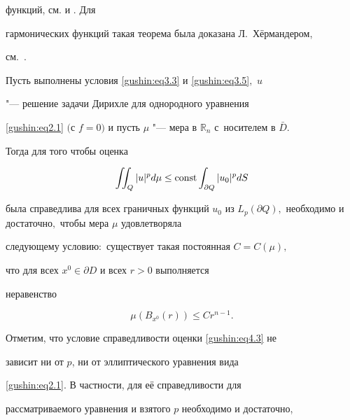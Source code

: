 функций, см. \cite{gushin:Car58} и \cite{gushin:Car62}. Для

гармонических функций такая теорема была доказана Л.~Хёрмандером,

см.~\cite{gushin:Her}.



\smallskip



\hypertarget{dush:th3}{}



\begin{theorem}[3]Пусть выполнены условия \eqref{gushin:eq3.3} и \eqref{gushin:eq3.5}$,$ $u$

"--- решение задачи Дирихле для однородного уравнения

\eqref{gushin:eq2.1} $($с $f = 0)$ и пусть $\mu$ "--- мера в ${\mathbb R}_n$ с~но\-сителем в $\bar{D}.$ 

Тогда для того чтобы оценка

\begin{equation}

\label{gushin:eq4.3} \iint _Q |u|^p d\mu \leq {\rm const}

\int _{\partial Q} |u_0|^p dS

\end{equation}

была справедлива для всех граничных функций $u_0$ из $L_p(\partial

Q),$ необходимо и достаточно$,$ чтобы мера $\mu$ удовлетворяла

следующему условию\/$:$ существует такая постоянная $C = C{(\mu)},$

что для всех $x^0 \in {\partial D}$ и всех $r > 0$ выполняется

неравенство

$$

\mu (B_{x^0}(r)) \leq C r^{n-1}.

$$

\end{theorem}



\smallskip



Отметим, что условие справедливости оценки \eqref{gushin:eq4.3} не

зависит ни от $p$, ни от эллиптического уравнения вида

\eqref{gushin:eq2.1}. В частности, для её справедливости для

рассматриваемого уравнения и взятого $p$ необходимо и достаточно,

